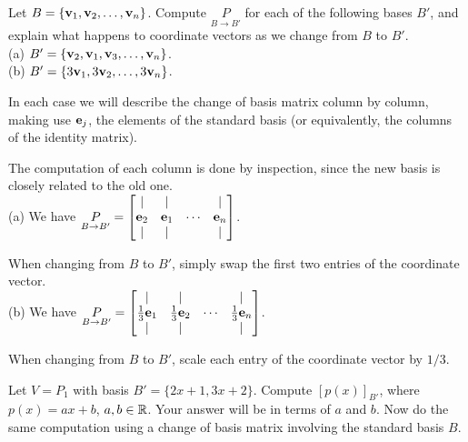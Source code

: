 \bb
\ii Let $B=\{{\mathbf v}_1,{\mathbf v}_2,\dots ,{\mathbf v}_n\}$. Compute $\underset{B\rightarrow B'}{P}$ for each of the following bases $B'$, and explain what happens to coordinate vectors as we change from $B$ to $B'$. 
\\
(a) $B'=\{{\mathbf v}_2,{\mathbf v}_1,{\mathbf v}_3,\dots, {\mathbf v}_n\}$. 
\\
(b) $B'=\{3{\mathbf v}_1, 3{\mathbf v}_2,\dots , 3{\mathbf v}_n\}$. 
\\
\begin{solution}
\noindent In each case we will describe the change of basis matrix column by column, making use ${\mathbf e}_j$, the elements of the standard basis (or equivalently, the columns of the identity matrix). 

The computation of each column is done by inspection, since the new basis is closely related to the old one. 
\\
(a) We have $\underset{B\rightarrow B'}{P}=\begin{bmatrix}
\vert &\vert& &\vert\\
{\mathbf e}_2&{\mathbf e}_1&\cdots &{\mathbf e}_n\\
\vert &\vert& &\vert
\end{bmatrix}$.

When changing from $B$ to $B'$, simply swap the first two entries of the coordinate vector. 
\\
(b) We have $\underset{B\rightarrow B'}{P}=\begin{bmatrix}
\vert &\vert& &\vert\\
\frac{1}{3}{\mathbf e}_1&\frac{1}{3}{\mathbf e}_2&\cdots &\frac{1}{3}{\mathbf e}_n\\
\vert &\vert& &\vert
\end{bmatrix}$.

When changing from $B$ to $B'$, scale each entry of the coordinate vector by $1/3$. 
\end{solution}
\ii Let $V=P_1$ with basis $B'=\{2x+1, 3x+2\}$. 
\bb
\ii Compute $[p(x)]_{B'}$, where $p(x)=ax+b$, $a,b\in{\mathbb R}$. Your answer will be in terms of $a$ and $b$.
\ii Now do the same computation using a change of basis matrix involving the standard basis $B$.
\ee
